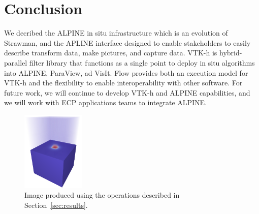 \documentclass[sigconf]{acmart}
\begin{document}


\maketitle







\section{Conclusion}
We decribed the ALPINE in situ infrastructure which is an evolution of Strawman, and the APLINE interface designed to enable stakeholders to easily describe transform data, make pictures, and capture data.
%
VTK-h is hybrid-parallel filter library that functions as a single point to deploy in situ algorithms into ALPINE, ParaView, ad VisIt.
%
Flow provides both an execution model for VTK-h and the flexibility to enable interoperability with other software.
%
For future work, we will continue to develop VTK-h and ALPINE capabilities, and we will work with ECP applications teams to integrate ALPINE.
 
\begin{figure}
	\includegraphics[width=3cm]{images/kripke}
	\caption{\label{kripke}Image produced using the operations described in Section~\ref{sec:results}.}
\end{figure}





 
\end{document}
